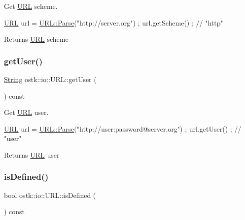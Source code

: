 Get \hyperlink{classostk_1_1io_1_1_u_r_l}{U\+RL} scheme. 


\begin{DoxyCode}
\hyperlink{classostk_1_1io_1_1_u_r_l_a2537e046cef4ac966cc295abb81279c2}{URL} url = \hyperlink{classostk_1_1io_1_1_u_r_l_a1cd7216bb1079f62386a218ba510958d}{URL::Parse}(\textcolor{stringliteral}{"http://server.org"}) ;
url.getScheme() ; \textcolor{comment}{// "http"}
\end{DoxyCode}


\begin{DoxyReturn}{Returns}
\hyperlink{classostk_1_1io_1_1_u_r_l}{U\+RL} scheme 
\end{DoxyReturn}
\mbox{\label{classostk_1_1io_1_1_u_r_l_ab3aeffffa4a2c72173e7e075d15e06fd}} 
\subsubsection{\texorpdfstring{get\+User()}{getUser()}}
{\footnotesize\ttfamily \hyperlink{namespaceostk_1_1io_a95d49b120613a7610cb1b4f03b1116b6}{String} ostk\+::io\+::\+U\+R\+L\+::get\+User (\begin{DoxyParamCaption}{ }\end{DoxyParamCaption}) const}



Get \hyperlink{classostk_1_1io_1_1_u_r_l}{U\+RL} user. 


\begin{DoxyCode}
\hyperlink{classostk_1_1io_1_1_u_r_l_a2537e046cef4ac966cc295abb81279c2}{URL} url = \hyperlink{classostk_1_1io_1_1_u_r_l_a1cd7216bb1079f62386a218ba510958d}{URL::Parse}(\textcolor{stringliteral}{"http://user:password@server.org"}) ;
url.getUser() ; \textcolor{comment}{// "user"}
\end{DoxyCode}


\begin{DoxyReturn}{Returns}
\hyperlink{classostk_1_1io_1_1_u_r_l}{U\+RL} user 
\end{DoxyReturn}
\mbox{\label{classostk_1_1io_1_1_u_r_l_ae777a4a970e3c36af2ca1e22a72336de}} 
\subsubsection{\texorpdfstring{is\+Defined()}{isDefined()}}
{\footnotesize\ttfamily bool ostk\+::io\+::\+U\+R\+L\+::is\+Defined (\begin{DoxyParamCaption}{ }\end{DoxyParamCaption}) const}




